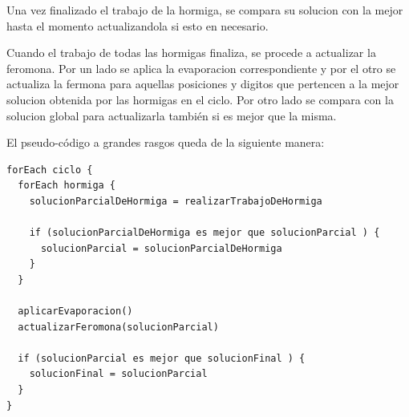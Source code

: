 Una vez finalizado el trabajo de la hormiga, se compara su solucion con la mejor 
hasta el momento actualizandola si esto en necesario.

Cuando el trabajo de todas las hormigas finaliza, se procede a actualizar la feromona. 
Por un lado se aplica la evaporacion correspondiente y por el otro se actualiza 
la fermona para aquellas posiciones y digitos que pertencen a la mejor solucion obtenida por las hormigas en el ciclo.
Por otro lado se compara con la solucion global para actualizarla también si es 
mejor que la misma.

El pseudo-código a grandes rasgos queda de la siguiente manera:

\begin{Verbatim}[samepage=true]
forEach ciclo {
  forEach hormiga {
    solucionParcialDeHormiga = realizarTrabajoDeHormiga
    
    if (solucionParcialDeHormiga es mejor que solucionParcial ) {
      solucionParcial = solucionParcialDeHormiga
    }
  }
  
  aplicarEvaporacion()
  actualizarFeromona(solucionParcial)
  
  if (solucionParcial es mejor que solucionFinal ) {
    solucionFinal = solucionParcial
  }
}
\end{Verbatim}









